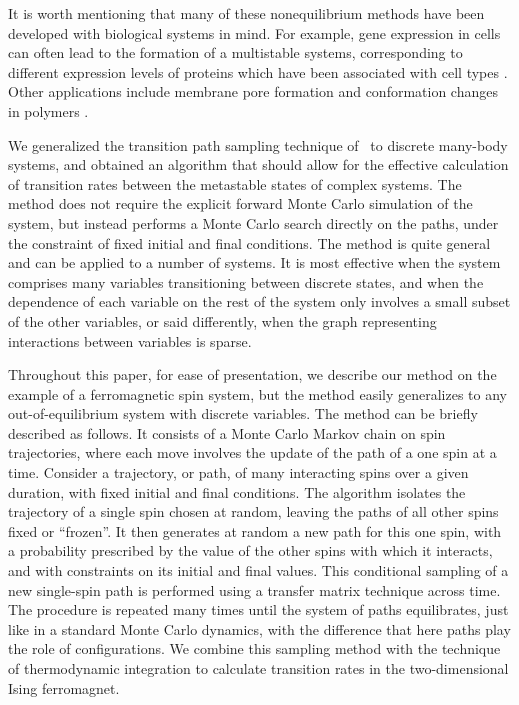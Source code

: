 \documentclass[aps,twocolumn,floats,pre,amsmath,superscriptaddress]{revtex4}
\newcommand{\<}{\langle}
\renewcommand{\>}{\rangle}
\begin{document}
It is worth mentioning that many of these nonequilibrium methods have been developed with biological systems in mind. For example, gene expression in cells can often lead to the formation of a multistable systems, corresponding to different expression levels of proteins which have been associated with cell types \cite{kauffman}. Other applications include membrane pore formation and conformation changes in polymers \cite{valerianirev, erik2}.

We generalized the transition path sampling technique of~\cite{chandler} to discrete many-body systems, 
and obtained an algorithm that should allow for the effective calculation of transition rates between the metastable states of complex systems. 
The method does not require the explicit forward Monte Carlo simulation of the system, but instead performs a Monte Carlo search directly on the paths, 
under the constraint of fixed initial and final conditions. The method is quite general and can be applied to a number of systems. 
It is most effective when the system comprises many variables transitioning between discrete states, 
and when the dependence of each variable on the rest of the system only involves a small subset of the other variables, 
or said differently, when the graph representing interactions between variables is sparse.

Throughout this paper, for ease of presentation, we describe our method on the example of a ferromagnetic spin system, 
but the method easily generalizes to any out-of-equilibrium system with discrete variables. 
The method can be briefly described as follows. 
It consists of a Monte Carlo Markov chain on spin trajectories, where each move involves the update of the path of a one spin at a time.
Consider a trajectory, or path, of many interacting spins over a given duration, with fixed initial and final conditions. 
The algorithm isolates the trajectory of a single spin chosen at random, leaving the paths of all other spins fixed or ``frozen''. 
It then generates at random a new path for this one spin, with a probability prescribed by the value of the other spins with which 
it interacts, and with constraints on its initial and final values.
This conditional sampling of a new single-spin path is performed using a transfer matrix technique across time. 
The procedure is repeated many times until the system of paths equilibrates, just like in a standard Monte Carlo dynamics, 
with the difference that here paths play the role of configurations.
We combine this sampling method with the technique of thermodynamic integration to calculate transition rates in the two-dimensional Ising ferromagnet. 
\end{document}
